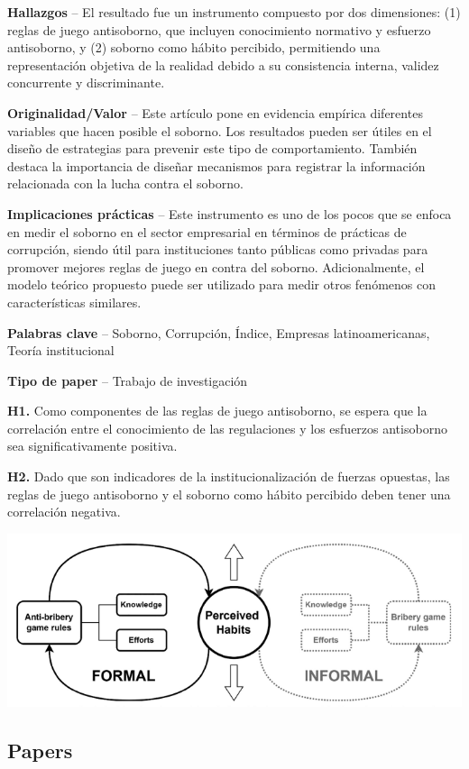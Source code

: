 \documentclass[
  letterpaper,
  DIV=11,
  numbers=noendperiod]{scrreprt}
\begin{document}
\textbf{Hallazgos} -- El resultado fue un instrumento compuesto por dos
dimensiones: (1) reglas de juego antisoborno, que incluyen conocimiento
normativo y esfuerzo antisoborno, y (2) soborno como hábito percibido,
permitiendo una representación objetiva de la realidad debido a su
consistencia interna, validez concurrente y discriminante.

\textbf{Originalidad/Valor} -- Este artículo pone en evidencia empírica
diferentes variables que hacen posible el soborno. Los resultados pueden
ser útiles en el diseño de estrategias para prevenir este tipo de
comportamiento. También destaca la importancia de diseñar mecanismos
para registrar la información relacionada con la lucha contra el
soborno.

\textbf{Implicaciones prácticas} -- Este instrumento es uno de los pocos
que se enfoca en medir el soborno en el sector empresarial en términos
de prácticas de corrupción, siendo útil para instituciones tanto
públicas como privadas para promover mejores reglas de juego en contra
del soborno. Adicionalmente, el modelo teórico propuesto puede ser
utilizado para medir otros fenómenos con características similares.

\textbf{Palabras clave} -- Soborno, Corrupción, Índice, Empresas
latinoamericanas, Teoría institucional

\textbf{Tipo de paper} -- Trabajo de investigación

\textbf{H1.} Como componentes de las reglas de juego antisoborno, se
espera que la correlación entre el conocimiento de las regulaciones y
los esfuerzos antisoborno sea significativamente positiva.

\textbf{H2.} Dado que son indicadores de la institucionalización de
fuerzas opuestas, las reglas de juego antisoborno y el soborno como
hábito percibido deben tener una correlación negativa.

\includegraphics{theorethical-model.png}

\subsection{Papers}\label{papers}
\end{document}
